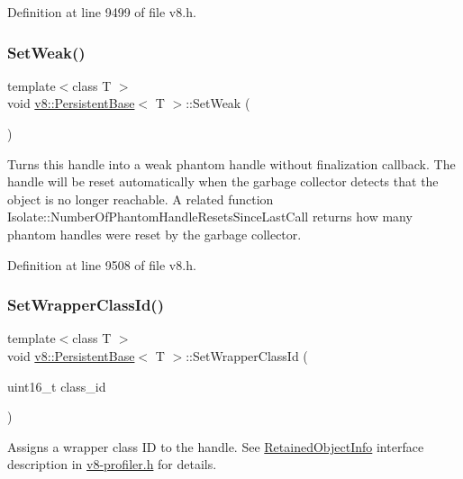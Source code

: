 Definition at line 9499 of file v8.\+h.

\mbox{\label{classv8_1_1PersistentBase_a09fd1d1c3cd3ff32b91937f4d8beb1ea}} 
\subsubsection{\texorpdfstring{Set\+Weak()}{SetWeak()}\hspace{0.1cm}{\footnotesize\ttfamily [2/2]}}
{\footnotesize\ttfamily template$<$class T $>$ \\
void \mbox{\hyperlink{classv8_1_1PersistentBase}{v8\+::\+Persistent\+Base}}$<$ T $>$\+::Set\+Weak (\begin{DoxyParamCaption}{ }\end{DoxyParamCaption})}

Turns this handle into a weak phantom handle without finalization callback. The handle will be reset automatically when the garbage collector detects that the object is no longer reachable. A related function Isolate\+::\+Number\+Of\+Phantom\+Handle\+Resets\+Since\+Last\+Call returns how many phantom handles were reset by the garbage collector. 

Definition at line 9508 of file v8.\+h.

\mbox{\label{classv8_1_1PersistentBase_ac4c979164b3ed4dc92319e6f5a108d3d}} 
\subsubsection{\texorpdfstring{Set\+Wrapper\+Class\+Id()}{SetWrapperClassId()}}
{\footnotesize\ttfamily template$<$class T $>$ \\
void \mbox{\hyperlink{classv8_1_1PersistentBase}{v8\+::\+Persistent\+Base}}$<$ T $>$\+::Set\+Wrapper\+Class\+Id (\begin{DoxyParamCaption}\item[{uint16\+\_\+t}]{class\+\_\+id }\end{DoxyParamCaption})}

Assigns a wrapper class ID to the handle. See \mbox{\hyperlink{classv8_1_1RetainedObjectInfo}{Retained\+Object\+Info}} interface description in \mbox{\hyperlink{v8-profiler_8h_source}{v8-\/profiler.\+h}} for details. 

